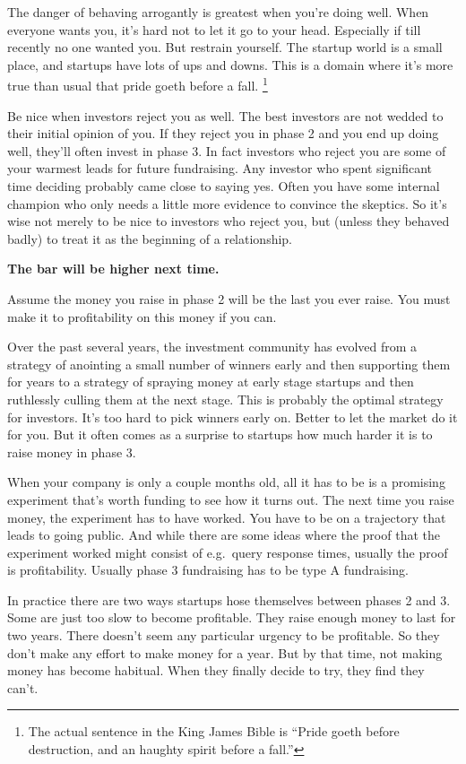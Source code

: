\documentclass[12pt]{book}
\begin{document}
The danger of behaving arrogantly is greatest when you're doing well.
When everyone wants you, it's hard not to let it go to your head.
Especially if till recently no one wanted you. But restrain yourself.
The startup world is a small place, and startups have lots of ups and
downs. This is a domain where it's more true than usual that pride goeth
before a fall. \footnote{The actual sentence in the King James Bible is ``Pride goeth
before destruction, and an haughty spirit before a fall.''}

Be nice when investors reject you as well. The best investors are not
wedded to their initial opinion of you. If they reject you in phase 2
and you end up doing well, they'll often invest in phase 3. In fact
investors who reject you are some of your warmest leads for future
fundraising. Any investor who spent significant time deciding probably
came close to saying yes. Often you have some internal champion who only
needs a little more evidence to convince the skeptics. So it's wise not
merely to be nice to investors who reject you, but (unless they behaved
badly) to treat it as the beginning of a relationship.

\textbf{The bar will be higher next time.}

Assume the money you raise in phase 2 will be the last you ever raise.
You must make it to profitability on this money if you can.

Over the past several years, the investment community has evolved from a
strategy of anointing a small number of winners early and then
supporting them for years to a strategy of spraying money at early stage
startups and then ruthlessly culling them at the next stage. This is
probably the optimal strategy for investors. It's too hard to pick
winners early on. Better to let the market do it for you. But it often
comes as a surprise to startups how much harder it is to raise money in
phase 3.

When your company is only a couple months old, all it has to be is a
promising experiment that's worth funding to see how it turns out. The
next time you raise money, the experiment has to have worked. You have
to be on a trajectory that leads to going public. And while there are
some ideas where the proof that the experiment worked might consist of
e.g.~query response times, usually the proof is profitability. Usually
phase 3 fundraising has to be type A fundraising.

In practice there are two ways startups hose themselves between phases 2
and 3. Some are just too slow to become profitable. They raise enough
money to last for two years. There doesn't seem any particular urgency
to be profitable. So they don't make any effort to make money for a
year. But by that time, not making money has become habitual. When they
finally decide to try, they find they can't.
\end{document}
